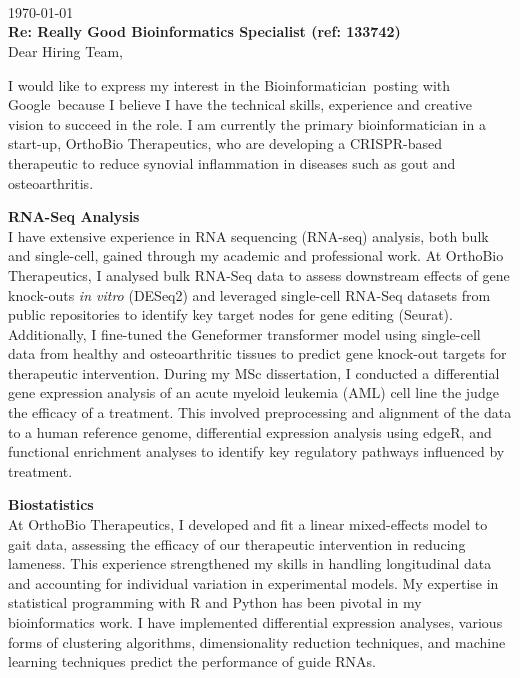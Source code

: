 \documentclass{resume}
\newcommand\JOB{Really Good Bioinformatics Specialist (ref: 133742)}
\newcommand\POSTING{Bioinformatician}
\newcommand\COMPANY{Google}
\newcommand\EMPLOYER{Hiring Team}
\newcommand\REF{}
\begin{document}
\begin{rSection}{}
\leavevmode \\ \\ \\
\today \\
\REF
\textbf{Re: \JOB}  \\ 

Dear \EMPLOYER ,

I would like to express my interest in the \POSTING\ posting with \COMPANY\ because I believe I have the technical skills, experience and creative vision to succeed in the role. I am currently the primary bioinformatician in a start-up, OrthoBio Therapeutics, who are developing a CRISPR-based therapeutic to reduce synovial inflammation in diseases such as gout and osteoarthritis. 

\textbf{RNA-Seq Analysis} \\
I have extensive experience in RNA sequencing (RNA-seq) analysis, both bulk and single-cell, gained through my academic and professional work. At OrthoBio Therapeutics, I analysed bulk RNA-Seq data to assess downstream effects of gene knock-outs \textit{in vitro} (DESeq2) and leveraged single-cell RNA-Seq datasets from public repositories to identify key target nodes for gene editing (Seurat). Additionally, I fine-tuned the Geneformer transformer model using single-cell data from healthy and osteoarthritic tissues to predict gene knock-out targets for therapeutic intervention. During my MSc dissertation, I conducted a differential gene expression analysis of an acute myeloid leukemia (AML) cell line the judge the efficacy of a treatment. This involved preprocessing and alignment of the data to a human reference genome, differential expression analysis using edgeR, and functional enrichment analyses to identify key regulatory pathways influenced by treatment. 

\textbf{Biostatistics} \\
At OrthoBio Therapeutics, I developed and fit a linear mixed-effects model to gait data, assessing the efficacy of our therapeutic intervention in reducing lameness. This experience strengthened my skills in handling longitudinal data and accounting for individual variation in experimental models. My expertise in statistical programming with R and Python has been pivotal in my bioinformatics work. I have implemented differential expression analyses, various forms of clustering algorithms, dimensionality reduction techniques, and  machine learning techniques predict the performance of guide RNAs.


\end{rSection}
\end{document}
